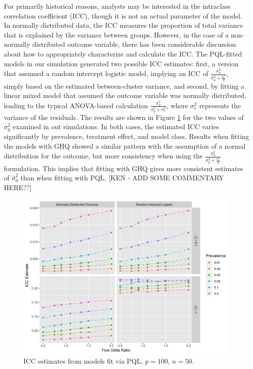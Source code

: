 \documentclass{article}
\begin{document}
\begin{flushleft}
For primarily historical reasons, analysts may be interested in the intraclass correlation coefficient (ICC), though it is not an actual parameter of the model. In normally distributed data, the ICC measures the proportion of total variance that is explained by the variance between groups. However, in the case of a non-normally distributed outcome variable, there has been considerable discussion about how to appropriately characterize and calculate the ICC\cite{wu_comparison_2012}\cite{nakagawa_shinichi_coefficient_2017}. The PQL-fitted models in our simulation generated two possible ICC estimates: first, a version that assumed a random intercept logistic model, implying an ICC of $\frac{\sigma^2_0}{\sigma^2_0+\frac{\pi^2}{3}}$, simply based on the estimated between-cluster variance, and second, by fitting a linear mixed model that assumed the outcome variable was normally distributed, leading to the typical ANOVA-based calculation $\frac{\sigma^2_0}{\sigma^2_0+\sigma^2_{\epsilon}}$, where $\sigma^2_{\epsilon}$ represents the variance of the residuals. The results are shown in Figure \ref{fig:_icc} for the two values of $\sigma^2_0$ examined in out simulations. In both cases, the estimated ICC varies significantly by prevalence, treatment effect, and model class. Results when fitting the models with GHQ showed a similar pattern with the assumption of a normal distribution for the outcome, but more consistency when using the $\frac{\sigma^2_0}{\sigma^2_0+\frac{\pi^2}{3}}$ formulation. This implies that fitting with GHQ gives more consistent estimates of $\hat{\sigma}^2_0$ than when fitting with PQL. [KEN - ADD SOME COMMENTARY HERE??]

\begin{figure}[]
\begin{center}
\includegraphics[width=12cm]{_icc_p100_n50.png}
  \caption{ICC estimates from models fit via PQL, $p=100$, $n=50$.}
    \label{fig:_icc}
\end{center}
\end{figure}



\end{flushleft}
\end{document}
